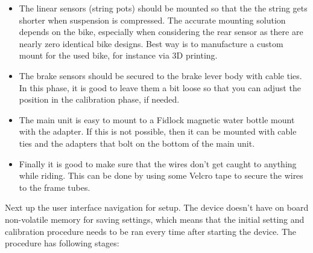 \documentclass[a4paper,11pt]{article} %
\begin{document}
\begin{itemize}
    \item The linear sensors (string pots) should be mounted so that the the string gets shorter when suspension is compressed. The accurate mounting solution depends on the bike, especially when considering the rear sensor as there are nearly zero identical bike designs. Best way is to manufacture a custom mount for the used bike, for instance via 3D printing.

    \item The brake sensors should be secured to the brake lever body with cable ties. In this phase, it is good to leave them a bit loose so that you can adjust the position in the calibration phase, if needed.

    \item The main unit is easy to mount to a Fidlock magnetic water bottle mount with the adapter. If this is not possible, then it can be mounted with cable ties and the adapters that bolt on the bottom of the main unit.

    \item Finally it is good to make sure that the wires don't get caught to anything while riding. This can be done by using some Velcro tape to secure the wires to the frame tubes.

\end{itemize}

Next up the user interface navigation for setup. The device doesn't have on board non-volatile memory for saving settings, which means that the initial setting and calibration procedure needs to be ran every time after starting the device. The procedure has following stages:
\end{document}
